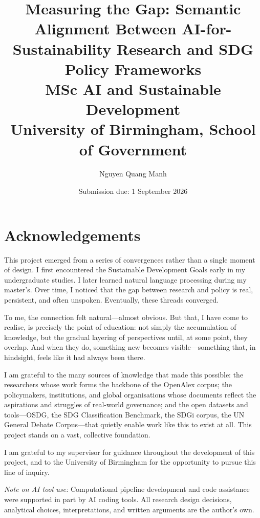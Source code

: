 \documentclass[12pt,a4paper]{article}
\title{\textbf{Measuring the Gap: Semantic Alignment Between AI-for-Sustainability Research and SDG Policy Frameworks}\\[1em]
\large MSc AI and Sustainable Development\\
University of Birmingham, School of Government}
\author{Nguyen Quang Manh}
\date{Submission due: 1 September 2026}
\begin{document}
\maketitle
\thispagestyle{fancy}
\tableofcontents
\newpage

\section*{Acknowledgements}

This project emerged from a series of convergences rather than a single moment of design. I first encountered the Sustainable Development Goals early in my undergraduate studies. I later learned natural language processing during my master's. Over time, I noticed that the gap between research and policy is real, persistent, and often unspoken. Eventually, these threads converged.

To me, the connection felt natural---almost obvious. But that, I have come to realise, is precisely the point of education: not simply the accumulation of knowledge, but the gradual layering of perspectives until, at some point, they overlap. And when they do, something new becomes visible---something that, in hindsight, feels like it had always been there.

I am grateful to the many sources of knowledge that made this possible: the researchers whose work forms the backbone of the OpenAlex corpus; the policymakers, institutions, and global organisations whose documents reflect the aspirations and struggles of real-world governance; and the open datasets and tools---OSDG, the SDG Classification Benchmark, the SDGi corpus, the UN General Debate Corpus---that quietly enable work like this to exist at all. This project stands on a vast, collective foundation.

I am grateful to my supervisor for guidance throughout the development of this project, and to the University of Birmingham for the opportunity to pursue this line of inquiry.

\textit{Note on AI tool use:} Computational pipeline development and code assistance were supported in part by AI coding tools. All research design decisions, analytical choices, interpretations, and written arguments are the author's own.

\newpage
\end{document}

